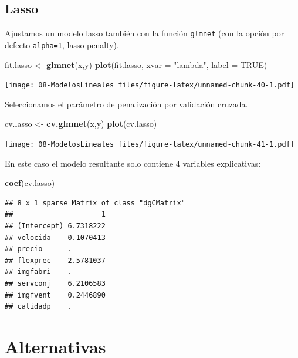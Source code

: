 \documentclass[]{book}
\newenvironment{Shaded}{\begin{snugshade}}{\end{snugshade}}
\newcommand{\KeywordTok}[1]{\textcolor[rgb]{0.13,0.29,0.53}{\textbf{#1}}}
\newcommand{\DataTypeTok}[1]{\textcolor[rgb]{0.13,0.29,0.53}{#1}}
\newcommand{\StringTok}[1]{\textcolor[rgb]{0.31,0.60,0.02}{#1}}
\newcommand{\OtherTok}[1]{\textcolor[rgb]{0.56,0.35,0.01}{#1}}
\newcommand{\NormalTok}[1]{#1}
\begin{document}
\subsection{Lasso}\label{lasso}

Ajustamos un modelo lasso también con la función \texttt{glmnet} (con la
opción por defecto \texttt{alpha=1}, lasso penalty).

\begin{Shaded}
\begin{Highlighting}[]
\NormalTok{fit.lasso <-}\StringTok{ }\KeywordTok{glmnet}\NormalTok{(x,y)}
\KeywordTok{plot}\NormalTok{(fit.lasso, }\DataTypeTok{xvar =} \StringTok{"lambda"}\NormalTok{, }\DataTypeTok{label =} \OtherTok{TRUE}\NormalTok{)}
\end{Highlighting}
\end{Shaded}

\texttt{[image: 08-ModelosLineales\_files/figure-latex/unnamed-chunk-40-1.pdf]}

Seleccionamos el parámetro de penalización por validación cruzada.

\begin{Shaded}
\begin{Highlighting}[]
\NormalTok{cv.lasso <-}\StringTok{ }\KeywordTok{cv.glmnet}\NormalTok{(x,y)}
\KeywordTok{plot}\NormalTok{(cv.lasso)}
\end{Highlighting}
\end{Shaded}

\texttt{[image: 08-ModelosLineales\_files/figure-latex/unnamed-chunk-41-1.pdf]}

En este caso el modelo resultante solo contiene 4 variables
explicativas:

\begin{Shaded}
\begin{Highlighting}[]
\KeywordTok{coef}\NormalTok{(cv.lasso)}
\end{Highlighting}
\end{Shaded}

\begin{verbatim}
## 8 x 1 sparse Matrix of class "dgCMatrix"
##                     1
## (Intercept) 6.7318222
## velocida    0.1070413
## precio      .        
## flexprec    2.5781037
## imgfabri    .        
## servconj    6.2106583
## imgfvent    0.2446890
## calidadp    .
\end{verbatim}

\section{Alternativas}\label{alternativas}
\end{document}
